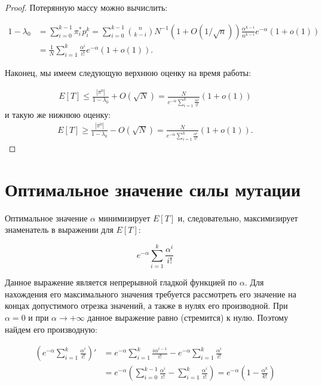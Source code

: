 \documentclass[russian]{article}
\begin{document}
\begin{proof}
Потерянную массу можно вычислить:

\begin{align*}
  1 - \lambda_0 &= \sum\limits_{i = 0}^{k - 1} \pi_i^* p_i^k = \sum\limits_{i = 0}^{k - 1} \binom{n}{k - i}N^{-1}(1 + O(1/\sqrt{n})) \frac{\alpha^{k - i}}{n^{k - i}}e^{-\alpha} (1 + o(1)) \\
  &= \frac{1}{N} \sum\limits_{i = 1}^{k} \frac{\alpha^i}{i!}e^{-\alpha} (1 + o(1)).
\end{align*}

Наконец, мы имеем следующую верхнюю оценку на время работы:

\begin{align*}
  E[T] \le \frac{|\pi^0|}{1 - \lambda_0} + O(\sqrt{N}) = \frac{N}{e^{-\alpha} \sum\limits_{i = 1}^k \frac{\alpha^i}{i!}} (1 + o(1))
\end{align*}
и такую же нижнюю оценку:
\begin{align*}
  E[T] \ge \frac{|\pi^0|}{1 - \lambda_0} - O(\sqrt{N}) = \frac{N}{e^{-\alpha} \sum\limits_{i = 1}^k \frac{\alpha^i}{i!}} (1 + o(1)).
\end{align*}

\end{proof}

\section{Оптимальное значение силы мутации}

Оптимальное значение $\alpha$ минимизирует $E[T]$ и, следовательно, максимизирует знаменатель в выражении для $E[T]:$

$$ e^{-\alpha} \sum\limits_{i = 1}^k \frac{\alpha^i}{i!}$$

Данное выражение является непрерывной гладкой функцией по $\alpha.$ Для нахождения его максимального значения требуется рассмотреть его значение на концах допустимого отрезка значений, а также в нулях его производной. При $\alpha = 0$ и при $\alpha \to +\infty$ данное выражение равно (стремится) к нулю. Поэтому найдем его производную:

\begin{align*}
(e^{-\alpha} \sum\limits_{i = 1}^k \frac{\alpha^i}{i!})'
       &= e^{-\alpha} \sum\limits_{i = 1}^k \frac{i\alpha^{i - 1}}{i!} - e^{-\alpha} \sum\limits_{i = 1}^k \frac{\alpha^i}{i!} \\
       &= e^{-\alpha}\left( \sum\limits_{i = 0}^{k - 1} \frac{\alpha^i}{i!} - \sum\limits_{i = 1}^k \frac{\alpha^i}{i!} \right) = e^{-\alpha} (1 - \frac{\alpha^k}{k!})
\end{align*}
\end{document}
